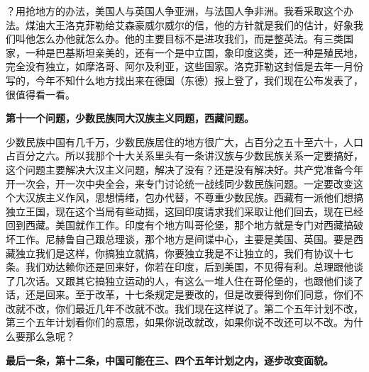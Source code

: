 ？用抢地方的办法，美国人与英国人争亚洲，与法国人争非洲。我看采取这个办法。煤油大王洛克菲勒给艾森豪威尔威尔的信，他的方针就是我们的估计，好象我们叫他怎么办他就怎么办。他的主要目标不是进攻我们，而是整英法。有三类国家，一种是巴基斯坦亲美的，还有一个是中立国，象印度这类，还一种是殖民地，完全没有独立，如摩洛哥、阿尔及利亚，这些国家。洛克菲勒这封信是去年一月份写的，今年不知什么地方找出来在德国（东德）报上登了，我们现在公布发表了，很值得看一看。

\textbf{第十一个问题，少数民族同大汉族主义同题，西藏问题。}

少数民族中国有几千万，少数民族居住的地方很广大，占百分之五十至六十，人口占百分之六。所以我那个十大关系里头有一条讲汉族与少数民族关系一定要搞好，这个问题主要解决大汉主义问题，解决了没有？还是没有解决好。共产党准备今年开一次会，开一次中央全会，来专门讨论统一战线同少数民族问题。一定要改变这个大汉族主义作风，思想情绪，包办代替，不尊重少数民族。西藏有一派他们想搞独立王国，现在这个当局有些动摇，这回印度请求我们采取让他们回去，现在已经回到西藏。美国就作工作。印度有个地方叫哥伦堡，那个地方就是专门对西藏搞破坏工作。尼赫鲁自己跟总理谈，那个地方是间谍中心，主要是美国、英国。要是西藏独立我们是这样，你搞独立就搞，你要独立我是不让独立的，我们有协议十七条。我们劝达赖你还是回来好，你若在印度，后到美国，不见得有利。总理跟他谈了几次话。又跟其它搞独立运动的人，有这么一堆人住在哥伦堡的，也跟他们谈了话，还是回来。至于改革，十七条规定是要改的，但是改要得到你们同意，你们不改就不改，你们最近几年不改就不改。我们现在这样说了。第二个五年计划不改，第三个五年计划看你们的意思，如果你说改就改，如果你说不改还可以不改。为什么要那么急呢？

\textbf{最后一条，第十二条，中国可能在三、四个五年计划之内，逐步改变面貌。}

